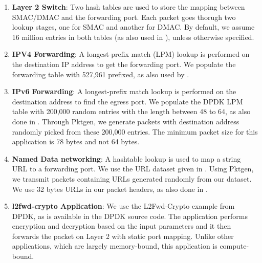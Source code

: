 \begin{enumerate}
\item \textbf{Layer 2 Switch}: Two hash tables are used to store the mapping between SMAC/DMAC and the forwarding port. Each packet goes thorugh two lookup stages, one for SMAC and another for DMAC. By default, we assume 16 million entries in both tables (as also used in \cite{189006}), unless otherwise specified.
\item \textbf{IPV4 Forwarding}: A longest-prefix match (LPM) lookup is performed on the destination IP address to get the forwarding port.
We populate the forwarding table with 527,961 prefixed, as also used by \cite{189006}.
\item \textbf{IPv6 Forwarding}: A longest-prefix match lookup is performed on the destination address to find the egress port. We populate the DPDK LPM table with 200,000 random entries with the length between 48 to 64, as also done in \cite{189006}. Through Pktgen, we generate packets with destination address randomly picked from these 200,000 entries. The minimum packet size for this application is 78 bytes and not 64 bytes.
\item \textbf{Named Data networking}: A hashtable lookup is used to map a string URL to a forwarding port.
We use the URL dataset given in \cite{DBLP:conf/globecom/ZhangWYLL13}. Using Pktgen, we transmit packets containing URLs generated randomly from our dataset. We use 32 bytes URLs in our packet headers, as also done in \cite{189006}.
\item \textbf{l2fwd-crypto Application}: We use the L2Fwd-Crypto\cite{l2crypto} example from DPDK, as is available in the DPDK source code. The application performs encryption and decryption based on the input parameters and it then forwards the packet on Layer 2 with static port mapping. Unlike other applications, which are largely memory-bound, this application is compute-bound.
\end{enumerate}

